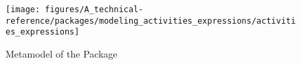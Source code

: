 %
%

\begin{figure}[htb]
  \centering
  \texttt{[image: figures/A\_technical-reference/packages/modeling\_activities\_expressions/activities\_expressions]}
  \caption{Metamodel of the  Package}
  \label{fig:MM:activities}
\end{figure}